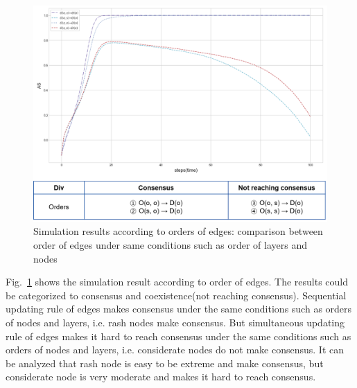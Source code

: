 \begin{figure}[!htb]
	\centering
	\includegraphics[width=\hsize]{figure/chap4_edgeorder.png}
	\caption{Simulation results according to orders of edges: comparison between order of edges under same conditions such as order of layers and nodes}
	\label{edgeorder}
\end{figure}

Fig.~\ref{edgeorder} shows the simulation result according to order of edges. The results could be categorized to consensus and coexistence(not reaching consensus). Sequential updating rule of edges makes consensus under the same conditions such as orders of nodes and layers, i.e. rash nodes make consensus. But simultaneous updating rule of edges makes it hard to reach consensus under the same conditions such as orders of nodes and layers, i.e. considerate nodes do not make consensus. It can be analyzed that rash node is easy to be extreme and make consensus, but considerate node is very moderate and makes it hard to reach consensus.
 
